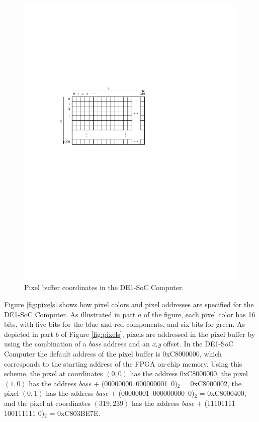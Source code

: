 \documentclass[epsfig,10pt,fullpage]{article}
\begin{document}
\begin{figure}[h!]
   \begin{center}
       \includegraphics{figures/fig_video_coord.pdf}
   \end{center}
   \caption{Pixel buffer coordinates in the DE1-SoC Computer.}
	\label{fig:video_coord}
\end{figure}

\noindent
Figure \ref{fig:pixels} shows how pixel colors and pixel addresses are specified for the 
DE1-SoC Computer. As illustrated in part $a$ of the figure, each pixel color has 16 bits, 
with five bits for the blue and red components, and six bits for green.  As depicted in 
part $b$ of Figure \ref{fig:pixels}, pixels are addressed in the pixel buffer by 
using the combination of a {\it base} address and an {\it x,y} offset.  In the DE1-SoC
Computer the default address of the pixel buffer is {\sf 0xC8000000}, which corresponds
to the starting address of the FPGA on-chip memory.  Using this scheme, the pixel at coordinates 
$(0,0)$ has the address {\sf 0xC8000000}, the pixel $(1,0)$ has the address {\it base} $+$ 
(00000000~000000001~0)$_2$ = {\sf 0xC8000002}, the pixel $(0,1)$ has the address {\it base} 
$+$ (00000001~000000000~0)$_2$ = {\sf 0xC8000400}, and the pixel at coordinates $(319,239)$
has the address {\it base} $+$ (11101111 100111111 0)$_2$ = {\sf 0xC803BE7E}. 
\end{document}
